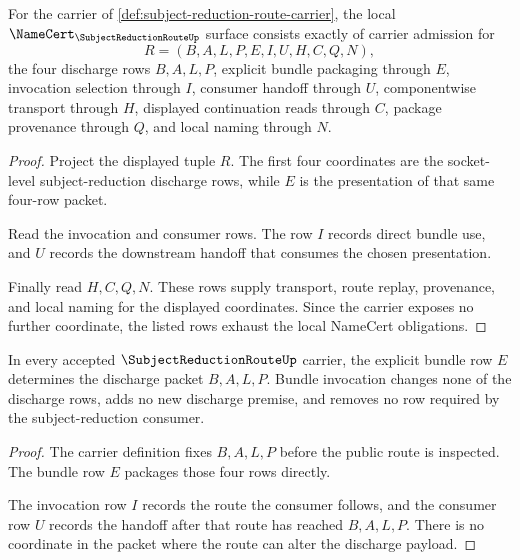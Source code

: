 \begin{theorem}
\label{thm:subject-reduction-route-namecert-obligations}
For the carrier of \autoref{def:subject-reduction-route-carrier}, the local $\NameCert_{\SubjectReductionRouteUp}$ surface consists exactly of carrier admission for
$$
R=(B,A,L,P,E,I,U,H,C,Q,N),
$$
the four discharge rows $B,A,L,P$, explicit bundle packaging through $E$, invocation selection through $I$, consumer handoff through $U$, componentwise transport through $H$, displayed continuation reads through $C$, package provenance through $Q$, and local naming through $N$.
\end{theorem}
\begin{proof}
Project the displayed tuple $R$. The first four coordinates are the socket-level subject-reduction discharge rows, while $E$ is the presentation of that same four-row packet.

Read the invocation and consumer rows. The row $I$ records direct bundle use, and $U$ records the downstream handoff that consumes the chosen presentation.

Finally read $H,C,Q,N$. These rows supply transport, route replay, provenance, and local naming for the displayed coordinates. Since the carrier exposes no further coordinate, the listed rows exhaust the local NameCert obligations.
\end{proof}

\begin{theorem}
\label{thm:subject-reduction-route-bundle-setup-correspondence}
In every accepted $\SubjectReductionRouteUp$ carrier, the explicit bundle row $E$ determines the discharge packet $B,A,L,P$. Bundle invocation changes none of the discharge rows, adds no new discharge premise, and removes no row required by the subject-reduction consumer.
\end{theorem}
\begin{proof}
The carrier definition fixes $B,A,L,P$ before the public route is inspected. The bundle row $E$ packages those four rows directly.

The invocation row $I$ records the route the consumer follows, and the consumer row $U$ records the handoff after that route has reached $B,A,L,P$. There is no coordinate in the packet where the route can alter the discharge payload.
\end{proof}

